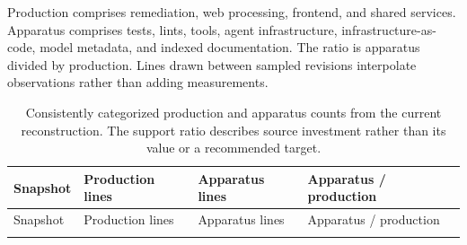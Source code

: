 Production comprises remediation, web processing, frontend, and shared services. Apparatus comprises tests, lints, tools, agent infrastructure, infrastructure-as-code, model metadata, and indexed documentation. The ratio is apparatus divided by production. Lines drawn between sampled revisions interpolate observations rather than adding measurements.

{\footnotesize
\begin{longtable}[]{@{}
  >{\raggedright\arraybackslash}p{}
  >{\raggedleft\arraybackslash}p{}
  >{\raggedleft\arraybackslash}p{}
  >{\raggedleft\arraybackslash}p{}@{}}
\caption[Current-window support ratio]{Consistently categorized production and apparatus counts from the current reconstruction. The support ratio describes source investment rather than its value or a recommended target.}\tabularnewline
\toprule\noalign{}
\begin{minipage}[b]{\linewidth}\raggedright
Snapshot
\end{minipage} & \begin{minipage}[b]{\linewidth}\raggedleft
Production lines
\end{minipage} & \begin{minipage}[b]{\linewidth}\raggedleft
Apparatus lines
\end{minipage} & \begin{minipage}[b]{\linewidth}\raggedleft
Apparatus / production
\end{minipage} \\
\midrule\noalign{}
\endfirsthead
\toprule\noalign{}
\begin{minipage}[b]{\linewidth}\raggedright
Snapshot
\end{minipage} & \begin{minipage}[b]{\linewidth}\raggedleft
Production lines
\end{minipage} & \begin{minipage}[b]{\linewidth}\raggedleft
Apparatus lines
\end{minipage} & \begin{minipage}[b]{\linewidth}\raggedleft
Apparatus / production
\end{minipage} \\
\midrule\noalign{}
\endhead
\bottomrule\noalign{}
\endlastfoot


\end{longtable}}
